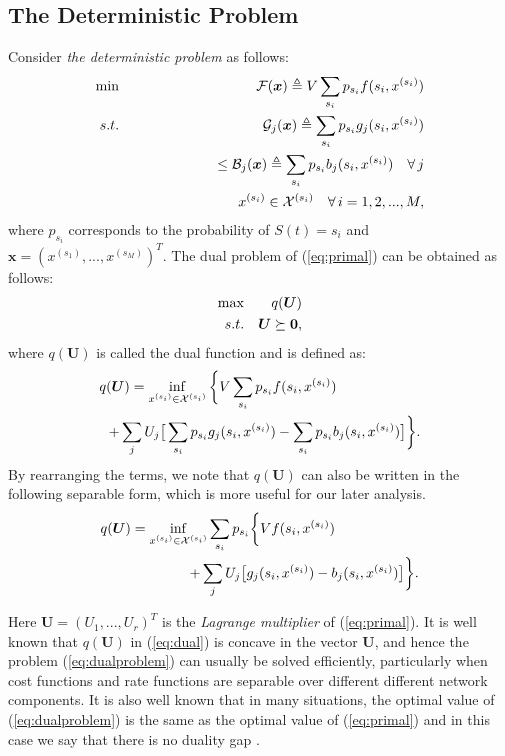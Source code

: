 \documentclass[journal]{IEEEtran}
\newcommand{\bv}[1]{{\boldsymbol{#1} }}
\newcommand{\script}[1]{{{\cal{#1} }}}
\begin{document}
\subsection{The Deterministic Problem}
Consider \emph{the deterministic problem} as follows: 
\begin{eqnarray}
\min&&\script{F}(\bv{x})\triangleq V\sum_{s_i}p_{s_i}f(s_i, x^{(s_i)})\label{eq:primal}\\
s.t.&&\script{G}_j(\bv{x})\triangleq\sum_{s_i}p_{s_i}g_j(s_i, x^{(s_i)})\nonumber\\
&&\qquad\qquad\qquad\leq \script{B}_j(\bv{x})\triangleq\sum_{s_i}p_{s_i}b_j(s_i, x^{(s_i)})\quad\forall\, j\nonumber\\
&& x^{(s_i)}\in \script{X}^{(s_i)}\quad \forall\, i=1, 2, ..., M,\nonumber
\end{eqnarray}
where $p_{s_i}$ corresponds to the probability of $S(t)=s_i$ and $\bv{x}=(x^{(s_1)}, ..., x^{(s_M)})^T$. The dual problem of (\ref{eq:primal}) can be obtained as follows:
\begin{eqnarray}
\hspace{-.0in}\max && q(\bv{U})\label{eq:dualproblem}\\
\hspace{-.0in} s.t.&& \bv{U}\succeq\bv{0}\nonumber,
\end{eqnarray}
where $q(\bv{U})$ is called the dual function and is defined as:
\begin{eqnarray}
q(\bv{U})=\inf_{x^{(s_i)}\in \script{X}^{(s_i)}}\bigg\{ V\sum_{s_i}p_{s_i}f(s_i, x^{(s_i)})\label{eq:dual}\qquad\qquad\qquad\\
+\sum_jU_j\big[ \sum_{s_i}p_{s_i}g_j(s_i, x^{(s_i)})- \sum_{s_i}p_{s_i}b_j(s_i, x^{(s_i)})\big]\bigg\}.\nonumber
\end{eqnarray}
By rearranging the terms, we note that $q(\bv{U})$ can also be written in the following separable form, which is more useful for our later analysis. 
\begin{eqnarray}
 q(\bv{U})=\inf_{x^{(s_i)}\in \script{X}^{(s_i)}}\sum_{s_i}p_{s_i}\bigg\{Vf(s_i, x^{(s_i)})\label{eq:dual_separable}\qquad\qquad\qquad\\
+\sum_jU_j\big[g_j(s_i, x^{(s_i)})- b_j(s_i, x^{(s_i)})\big]\bigg\}.\nonumber
\end{eqnarray}

Here $\bv{U}=(U_1, ..., U_r)^T$ is the \emph{Lagrange multiplier} of (\ref{eq:primal}). It is well known that $q(\bv{U})$ in (\ref{eq:dual}) is concave in the vector $\bv{U}$, and hence the problem (\ref{eq:dualproblem}) can usually be solved efficiently, particularly when cost functions and rate functions are separable over different different network components. It is also well known that in many situations, the optimal value of (\ref{eq:dualproblem}) is the same as the optimal value of (\ref{eq:primal}) and in this case we say that there is no duality gap \cite{bertsekasoptbook}. 
\end{document}
